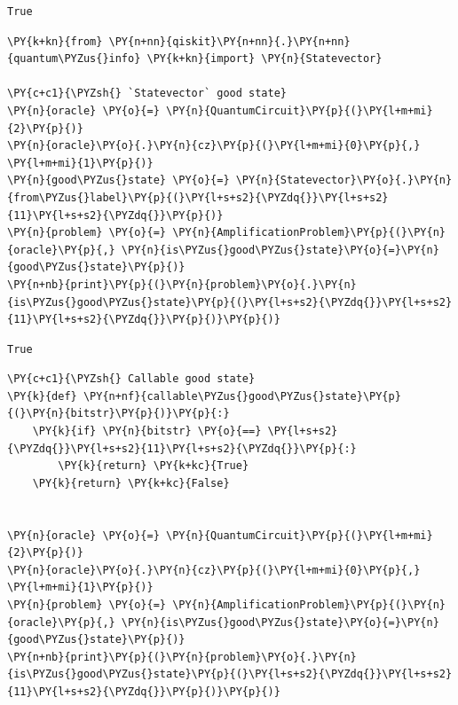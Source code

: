     \begin{Verbatim}[commandchars=\\\{\}]
True
    \end{Verbatim}

    \begin{tcolorbox}[breakable, size=fbox, boxrule=1pt, pad at break*=1mm,colback=cellbackground, colframe=cellborder]
\begin{Verbatim}[commandchars=\\\{\}]
\PY{k+kn}{from} \PY{n+nn}{qiskit}\PY{n+nn}{.}\PY{n+nn}{quantum\PYZus{}info} \PY{k+kn}{import} \PY{n}{Statevector}

\PY{c+c1}{\PYZsh{} `Statevector` good state}
\PY{n}{oracle} \PY{o}{=} \PY{n}{QuantumCircuit}\PY{p}{(}\PY{l+m+mi}{2}\PY{p}{)}
\PY{n}{oracle}\PY{o}{.}\PY{n}{cz}\PY{p}{(}\PY{l+m+mi}{0}\PY{p}{,} \PY{l+m+mi}{1}\PY{p}{)}
\PY{n}{good\PYZus{}state} \PY{o}{=} \PY{n}{Statevector}\PY{o}{.}\PY{n}{from\PYZus{}label}\PY{p}{(}\PY{l+s+s2}{\PYZdq{}}\PY{l+s+s2}{11}\PY{l+s+s2}{\PYZdq{}}\PY{p}{)}
\PY{n}{problem} \PY{o}{=} \PY{n}{AmplificationProblem}\PY{p}{(}\PY{n}{oracle}\PY{p}{,} \PY{n}{is\PYZus{}good\PYZus{}state}\PY{o}{=}\PY{n}{good\PYZus{}state}\PY{p}{)}
\PY{n+nb}{print}\PY{p}{(}\PY{n}{problem}\PY{o}{.}\PY{n}{is\PYZus{}good\PYZus{}state}\PY{p}{(}\PY{l+s+s2}{\PYZdq{}}\PY{l+s+s2}{11}\PY{l+s+s2}{\PYZdq{}}\PY{p}{)}\PY{p}{)}
\end{Verbatim}
\end{tcolorbox}

    \begin{Verbatim}[commandchars=\\\{\}]
True
    \end{Verbatim}

    \begin{tcolorbox}[breakable, size=fbox, boxrule=1pt, pad at break*=1mm,colback=cellbackground, colframe=cellborder]
\begin{Verbatim}[commandchars=\\\{\}]
\PY{c+c1}{\PYZsh{} Callable good state}
\PY{k}{def} \PY{n+nf}{callable\PYZus{}good\PYZus{}state}\PY{p}{(}\PY{n}{bitstr}\PY{p}{)}\PY{p}{:}
    \PY{k}{if} \PY{n}{bitstr} \PY{o}{==} \PY{l+s+s2}{\PYZdq{}}\PY{l+s+s2}{11}\PY{l+s+s2}{\PYZdq{}}\PY{p}{:}
        \PY{k}{return} \PY{k+kc}{True}
    \PY{k}{return} \PY{k+kc}{False}


\PY{n}{oracle} \PY{o}{=} \PY{n}{QuantumCircuit}\PY{p}{(}\PY{l+m+mi}{2}\PY{p}{)}
\PY{n}{oracle}\PY{o}{.}\PY{n}{cz}\PY{p}{(}\PY{l+m+mi}{0}\PY{p}{,} \PY{l+m+mi}{1}\PY{p}{)}
\PY{n}{problem} \PY{o}{=} \PY{n}{AmplificationProblem}\PY{p}{(}\PY{n}{oracle}\PY{p}{,} \PY{n}{is\PYZus{}good\PYZus{}state}\PY{o}{=}\PY{n}{good\PYZus{}state}\PY{p}{)}
\PY{n+nb}{print}\PY{p}{(}\PY{n}{problem}\PY{o}{.}\PY{n}{is\PYZus{}good\PYZus{}state}\PY{p}{(}\PY{l+s+s2}{\PYZdq{}}\PY{l+s+s2}{11}\PY{l+s+s2}{\PYZdq{}}\PY{p}{)}\PY{p}{)}
\end{Verbatim}
\end{tcolorbox}

